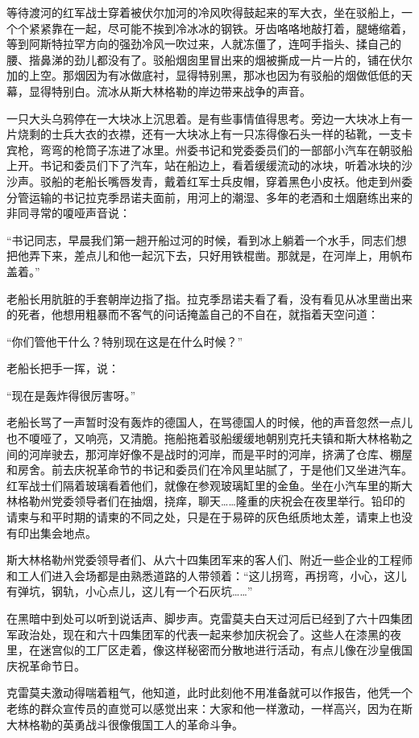 等待渡河的红军战士穿着被伏尔加河的冷风吹得鼓起来的军大衣，坐在驳船上，一个个紧紧靠在一起，尽可能不挨到冷冰冰的钢铁。牙齿咯咯地敲打着，腿蜷缩着，等到阿斯特拉罕方向的强劲冷风一吹过来，人就冻僵了，连呵手指头、揉自己的腰、揩鼻涕的劲儿都没有了。驳船烟囱里冒出来的烟被撕成一片一片的，铺在伏尔加的上空。那烟因为有冰做底衬，显得特别黑，那冰也因为有驳船的烟做低低的天幕，显得特别白。流冰从斯大林格勒的岸边带来战争的声音。

一只大头乌鸦停在一大块冰上沉思着。是有些事情值得思考。旁边一大块冰上有一片烧剩的士兵大衣的衣襟，还有一大块冰上有一只冻得像石头一样的毡靴，一支卡宾枪，弯弯的枪筒子冻进了冰里。州委书记和党委委员们的一部部小汽车在朝驳船上开。书记和委员们下了汽车，站在船边上，看着缓缓流动的冰块，听着冰块的沙沙声。驳船的老船长嘴唇发青，戴着红军士兵皮帽，穿着黑色小皮袄。他走到州委分管运输的书记拉克季昂诺夫面前，用河上的潮湿、多年的老酒和土烟磨练出来的非同寻常的嗄哑声音说：

“书记同志，早晨我们第一趟开船过河的时候，看到冰上躺着一个水手，同志们想把他弄下来，差点儿和他一起沉下去，只好用铁棍凿。那就是，在河岸上，用帆布盖着。”

老船长用肮脏的手套朝岸边指了指。拉克季昂诺夫看了看，没有看见从冰里凿出来的死者，他想用粗暴而不客气的问话掩盖自己的不自在，就指着天空问道：

“你们管他干什么？特别现在这是在什么时候？”

老船长把手一挥，说：

“现在是轰炸得很厉害呀。”

老船长骂了一声暂时没有轰炸的德国人，在骂德国人的时候，他的声音忽然一点儿也不嗄哑了，又响亮，又清脆。拖船拖着驳船缓缓地朝别克托夫镇和斯大林格勒之间的河岸驶去，那河岸好像不是战时的河岸，而是平时的河岸，挤满了仓库、棚屋和房舍。前去庆祝革命节的书记和委员们在冷风里站腻了，于是他们又坐进汽车。红军战士们隔着玻璃看着他们，就像在参观玻璃缸里的金鱼。坐在小汽车里的斯大林格勒州党委领导者们在抽烟，挠痒，聊天……隆重的庆祝会在夜里举行。铅印的请柬与和平时期的请柬的不同之处，只是在于易碎的灰色纸质地太差，请柬上也没有印出集会地点。

斯大林格勒州党委领导者们、从六十四集团军来的客人们、附近一些企业的工程师和工人们进入会场都是由熟悉道路的人带领着：“这儿拐弯，再拐弯，小心，这儿有弹坑，钢轨，小心点儿，这儿有一个石灰坑……”

在黑暗中到处可以听到说话声、脚步声。克雷莫夫白天过河后已经到了六十四集团军政治处，现在和六十四集团军的代表一起来参加庆祝会了。这些人在漆黑的夜里，在迷宫似的工厂区走着，像这样秘密而分散地进行活动，有点儿像在沙皇俄国庆祝革命节日。

克雷莫夫激动得喘着粗气，他知道，此时此刻他不用准备就可以作报告，他凭一个老练的群众宣传员的直觉可以感觉出来：大家和他一样激动，一样高兴，因为在斯大林格勒的英勇战斗很像俄国工人的革命斗争。

